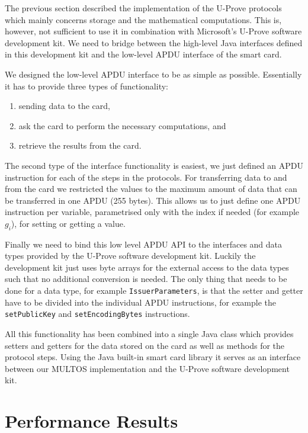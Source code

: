 The previous section described the implementation of the U-Prove protocols which
mainly concerns storage and the mathematical computations. This is, however, not
sufficient to use it in combination with Microsoft's U-Prove software
development kit. We need to bridge between the high-level Java interfaces
defined in this development kit and the low-level APDU interface of the smart
card.

We designed the low-level APDU interface to be as simple as possible.
Essentially it has to provide three types of functionality:
\begin{enumerate}
  \item sending data to the card,
  \item ask the card to perform the necessary computations, and
  \item retrieve the results from the card.
\end{enumerate}
The second type of the interface functionality is easiest, we just defined an
APDU instruction for each of the steps in the protocols. For transferring data
to and from the card we restricted the values to the maximum amount of data that
can be transferred in one APDU (255 bytes). This allows us to just define one
APDU instruction per variable, parametrised only with the index if needed (for
example $g_i$), for setting or getting a value.

Finally we need to bind this low level APDU API to the interfaces and data types
provided by the U-Prove software development kit. Luckily the development kit
just uses byte arrays for the external access to the data types such that no
additional conversion is needed. The only thing that needs to be done for a data
type, for example \texttt{IssuerParameters}, is that the setter and getter
have to be divided into the individual APDU instructions, for example the
\texttt{setPublicKey} and \texttt{setEncodingBytes} instructions.

All this functionality has been combined into a single Java class which provides
setters and getters for the data stored on the card as well as methods for the
protocol steps. Using the Java built-in smart card library it serves as an
interface between our MULTOS implementation and the U-Prove software development
kit.

\section{Performance Results\label{sec:UP-performance}}

